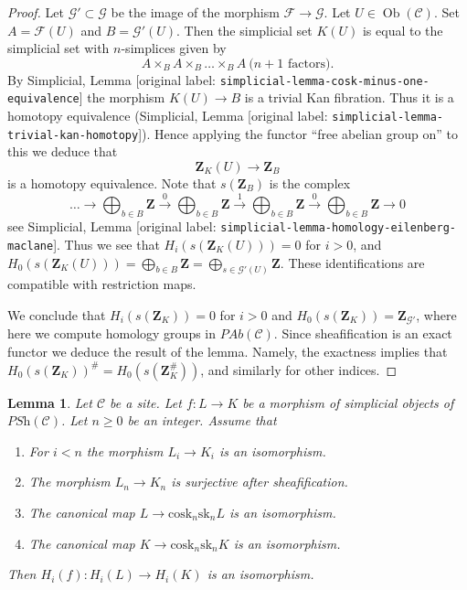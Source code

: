 \documentclass[10pt,a4paper]{article}
\theoremstyle{plain}
\newtheorem{lemma}[subsection]{Lemma}
\theoremstyle{definition}
\theoremstyle{remark}
\numberwithin{equation}{subsection}
\def\Ob{\mathop{\mathrm{Ob}}\nolimits}
\begin{document}
\begin{proof}
Let $\mathcal{G}' \subset \mathcal{G}$ be the image of
the morphism $\mathcal{F} \to \mathcal{G}$.
Let $U \in \Ob(\mathcal{C})$. Set
$A = \mathcal{F}(U)$ and $B = \mathcal{G}'(U)$.
Then the simplicial set $K(U)$ is equal to the simplicial
set with $n$-simplices given by
$$
A \times_B A \times_B \ldots \times_B A\ (n + 1 \text{ factors)}.
$$
By Simplicial, Lemma \textnormal{[original label: \nolinkurl{simplicial-lemma-cosk-minus-one-equivalence}]}
the morphism $K(U) \to B$ is a trivial Kan fibration.
Thus it is a homotopy equivalence
(Simplicial, Lemma \textnormal{[original label: \nolinkurl{simplicial-lemma-trivial-kan-homotopy}]}).
Hence applying the functor ``free abelian group on'' to this
we deduce that
$$
\mathbf{Z}_K(U) \longrightarrow \mathbf{Z}_B
$$
is a homotopy equivalence. Note that $s(\mathbf{Z}_B)$ is
the complex
$$
\ldots \to
\bigoplus\nolimits_{b \in B}\mathbf{Z} \xrightarrow{0}
\bigoplus\nolimits_{b \in B}\mathbf{Z} \xrightarrow{1}
\bigoplus\nolimits_{b \in B}\mathbf{Z} \xrightarrow{0}
\bigoplus\nolimits_{b \in B}\mathbf{Z} \to 0
$$
see Simplicial, Lemma \textnormal{[original label: \nolinkurl{simplicial-lemma-homology-eilenberg-maclane}]}.
Thus we see that
$H_i(s(\mathbf{Z}_K(U))) = 0$ for $i > 0$, and
$H_0(s(\mathbf{Z}_K(U))) = \bigoplus_{b \in B}\mathbf{Z}
= \bigoplus_{s \in \mathcal{G}'(U)} \mathbf{Z}$.
These identifications are compatible with restriction
maps.

\medskip\noindent
We conclude that $H_i(s(\mathbf{Z}_K)) = 0$ for $i > 0$ and
$H_0(s(\mathbf{Z}_K)) = \mathbf{Z}_{\mathcal{G}'}$, where here
we compute homology groups in $\textit{PAb}(\mathcal{C})$. Since
sheafification is an exact functor we deduce the result
of the lemma. Namely, the exactness implies
that $H_0(s(\mathbf{Z}_K))^\# = H_0(s(\mathbf{Z}_K^\#))$,
and similarly for other indices.
\end{proof}

\begin{lemma}
\label{lemma-acyclicity}
Let $\mathcal{C}$ be a site.
Let $f : L \to K$ be a morphism of
simplicial objects of $\textit{PSh}(\mathcal{C})$.
Let $n \geq 0$ be an integer.
Assume that
\begin{enumerate}
\item For $i < n$ the morphism $L_i \to K_i$ is an isomorphism.
\item The morphism $L_n \to K_n$ is surjective after sheafification.
\item The canonical map $L \to \text{cosk}_n \text{sk}_n L$ is an isomorphism.
\item The canonical map $K \to \text{cosk}_n \text{sk}_n K$ is an isomorphism.
\end{enumerate}
Then $H_i(f) : H_i(L) \to H_i(K)$ is an isomorphism.
\end{lemma}
\end{document}
